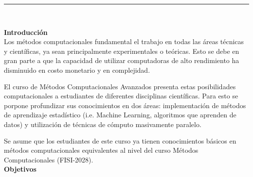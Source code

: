 \documentclass[letterpaper,10pt,onecolumn]{article}
\begin{document}





\noindent\rule{\textwidth}{1pt}\\[-0.1cm]

\addtocounter{mysection}{1}

\noindent\textbf{\large {} \quad Introducci\'on}\\[-0.2cm]


\noindent\normalsize Los m\'etodos computacionales fundamental el
trabajo en todas las \'areas t\'ecnicas y cient\'ificas,
ya sean principalmente experimentales o te\'oricas. Esto se debe en
gran parte a que la capacidad de utilizar computadoras de alto
rendimiento ha disminuido en costo monetario y en complejidad.

El curso de M\'etodos Computacionales Avanzados presenta estas
posibilidades computacionales a estudiantes de diferentes disciplinas
cient\'ificas. Para esto se porpone profundizar sus conocimientos
en dos \'areas: implementaci\'on de m\'etodos de aprendizaje estadístico (i.e. Machine Learning, algoritmos que aprenden de datos) y utilizaci\'on de t\'ecnicas de c\'omputo
masivamente paralelo.

Se asume que los estudiantes de este curso ya tienen conocimientos
b\'asicos en m\'etodos computacionales equivalentes al nivel del curso
M\'etodos Computacionales (FISI-2028).
\\[0.1cm]

\noindent\textbf{\large {} \quad Objetivos}\\[-0.2cm]
\end{document}
